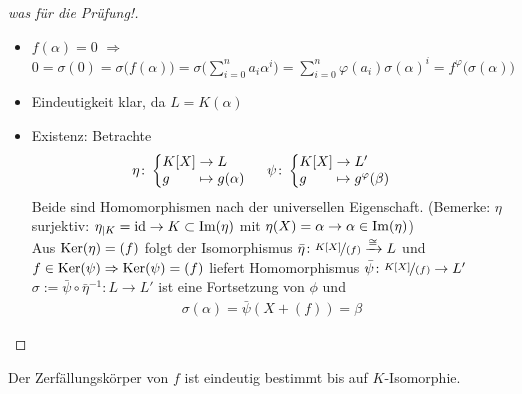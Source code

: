 \begin{proof}[was für die Prüfung!]\leavevmode\vspace*{\dimexpr-\baselineskip+2\lineskip}
	\begin{itemize}
		\item $f(\alpha) = 0$ $\Rightarrow$ $0 = \sigma(0) = \sigma\big(f(\alpha)\big) = \sigma\big(\sum_{i=0}^n a_i \alpha^i\big) = \sum_{i=0}^n \varphi(a_i)\sigma(\alpha)^i = f^{\varphi}\big(\sigma(\alpha)\big)$
		\item Eindeutigkeit klar, da $L=K(\alpha)$
		\item Existenz: Betrachte 
		\begin{align*}
			\eta\colon&
			\left\lbrace\begin{array}{@{}l@{\;}c@{\;}l}
				K[X] &\to& L\\
				g &\mapsto& g(\alpha)
			\end{array}\right.&
			\psi\colon&
			\left\lbrace\begin{array}{@{}l@{\;}c@{\;}l}
				K[X] &\to& L'\\
				g &\mapsto& g^{\varphi}(\beta) 
			\end{array}\right.
		\end{align*}
		Beide sind Homomorphismen nach der universellen Eigenschaft.
		(Bemerke: $\eta$ surjektiv: $\eta_{\mid K} = \operatorname{id} \to K \subset \operatorname{Im}(\eta)$ mit $\eta(X) = \alpha \to \alpha \in \operatorname{Im}(\eta)$)\\
		Aus $\operatorname{Ker}(\eta)=(f)$ folgt der Isomorphismus $\bar{\eta}\colon \lnkset{K[X]}{(f)} \xrightarrow{\cong}L$ und\\
		$f \in \operatorname{Ker}(\psi) \Rightarrow \operatorname{Ker}(\psi) = (f)$ liefert Homomorphismus $\bar{\psi}\colon \lnkset{K[X]}{(f)} \to L'$\\
		$\sigma:= \bar{\psi}\circ \bar{\eta}^{-1}\colon L \to L'$ ist eine Fortsetzung von $\phi$ und
		\begin{align*}
			\sigma(\alpha) = \bar{\psi}(X+(f)) = \beta
		\end{align*}
	\end{itemize}
\end{proof}
\begin{proposition}
	Der Zerfällungskörper von $f$ ist eindeutig bestimmt bis auf $K$-Isomorphie.
\end{proposition}
